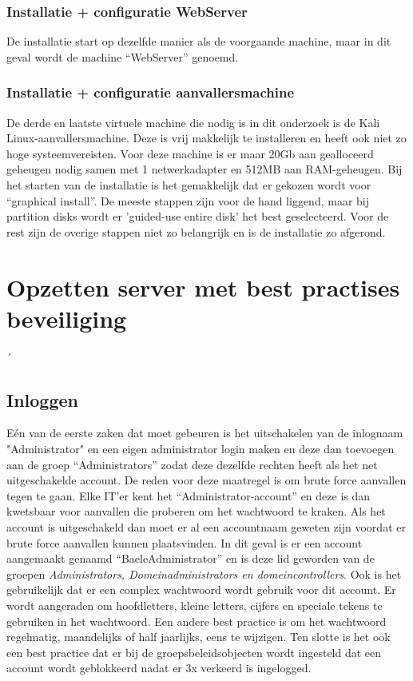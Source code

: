 \documentclass[pdftex,a4paper,12pt]{report}
\begin{document}
\subsection{Installatie + configuratie WebServer}
De installatie start op dezelfde manier als de voorgaande machine, maar in dit geval wordt de machine "`WebServer"' genoemd.

\subsection{Installatie + configuratie aanvallersmachine}
De derde en laatste virtuele machine die nodig is in dit onderzoek is de Kali Linux-aanvallersmachine. Deze is vrij makkelijk te installeren en heeft ook niet zo hoge systeemvereisten. Voor deze machine is er maar 20Gb aan gealloceerd geheugen nodig samen met 1 netwerkadapter en 512MB aan RAM-geheugen. Bij het starten van de installatie is het gemakkelijk dat er gekozen wordt voor "`graphical install"'. De meeste stappen zijn voor de hand liggend, maar bij partition disks wordt er 'guided-use entire disk' het best geselecteerd. Voor de rest zijn de overige stappen niet zo belangrijk en is de installatie zo afgerond.

\chapter{Opzetten server met best practises beveiliging}
´%

\section{Inloggen}
Eén van de eerste zaken dat moet gebeuren is het uitschakelen van de inlognaam "Administrator" en een eigen administrator login maken en deze dan toevoegen aan de groep "`Administrators"' zodat deze dezelfde rechten heeft als het net uitgeschakelde account. De reden voor deze maatregel is om brute force aanvallen tegen te gaan. Elke IT'er kent het "`Administrator-account"' en deze is dan kwetsbaar voor aanvallen die proberen om het wachtwoord te kraken. Als het account is uitgeschakeld dan moet er al een accountnaam geweten zijn voordat er brute force aanvallen kunnen plaatsvinden. In dit geval is er een account aangemaakt genaamd "`BaeleAdministrator"' en is deze lid geworden van de groepen \textit{Administrators, Domeinadministrators en domeincontrollers}. Ook is het gebruikelijk dat er een complex wachtwoord wordt gebruik voor dit account. Er wordt aangeraden om hoofdletters, kleine letters, cijfers en speciale tekens te gebruiken in het wachtwoord. Een andere best practice is om het wachtwoord regelmatig, maandelijks of half jaarlijks, eens te wijzigen. Ten slotte is het ook een best practice dat er bij de groepsbeleidsobjecten wordt ingesteld dat een account wordt geblokkeerd nadat er 3x verkeerd is ingelogged. 
\end{document}
